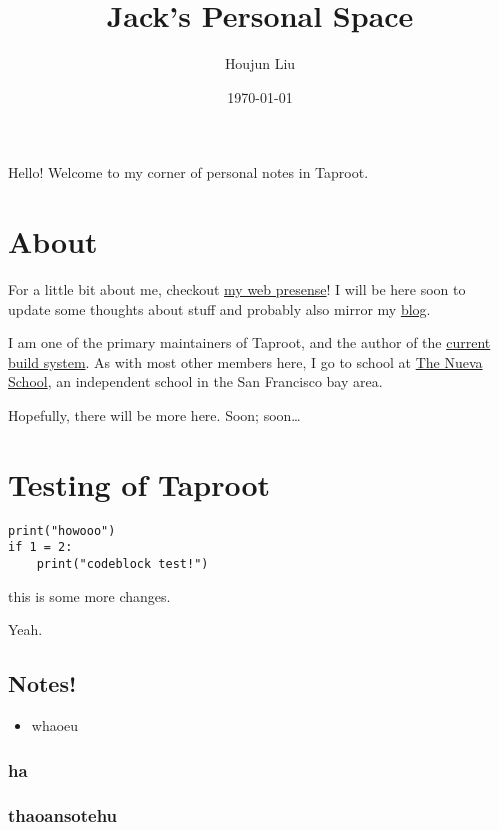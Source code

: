 \documentclass[letterpaper]{article}
\author{Houjun Liu}
\date{\today}
\title{Jack's Personal Space}
\renewcommand\maketitle{}
\begin{document}
\maketitle
Hello! Welcome to my corner of personal notes in Taproot.

\section{About}
\label{sec:orgfc10917}
For a little bit about me, checkout \href{https://www.jemoka.com/}{my web presense}! I will be here soon to update some thoughts about stuff and probably also mirror my \href{https://medium.com/20minuterants}{blog}.

I am one of the primary maintainers of Taproot, and the author of the \href{https://github.com/InSanityHQ/taproot3/}{current build system}. As with most other members here, I go to school at \href{https://www.nuevaschool.org}{The Nueva School}, an independent school in the San Francisco bay area.

Hopefully, there will be more here. Soon; soon\ldots{}


\section{Testing of Taproot}
\label{sec:orgf37a8d9}
\begin{verbatim}
print("howooo")
if 1 = 2:
    print("codeblock test!")
\end{verbatim}

this is some more changes.



Yeah.

\subsection{Notes!}
\label{sec:org8b382cb}
\begin{itemize}
\item whaoeu
\end{itemize}
\subsubsection{ha}
\label{sec:orga381f2d}

\subsubsection{thaoansotehu}
\label{sec:orgabdcf68}
\end{document}

